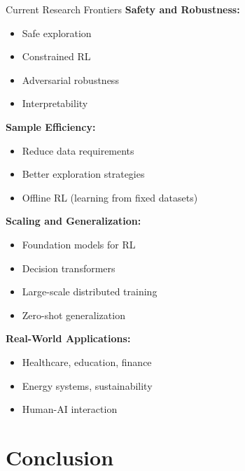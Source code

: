 \documentclass[aspectratio=169]{beamer}
\begin{document}
\begin{frame}{Current Research Frontiers}
  \textbf{Safety and Robustness:}
  \begin{itemize}
    \item Safe exploration
    \item Constrained RL
    \item Adversarial robustness
    \item Interpretability
  \end{itemize}

  \vspace{0.5em}

  \textbf{Sample Efficiency:}
  \begin{itemize}
    \item Reduce data requirements
    \item Better exploration strategies
    \item Offline RL (learning from fixed datasets)
  \end{itemize}

  \vspace{0.5em}

  \textbf{Scaling and Generalization:}
  \begin{itemize}
    \item Foundation models for RL
    \item Decision transformers
    \item Large-scale distributed training
    \item Zero-shot generalization
  \end{itemize}

  \vspace{0.5em}

  \textbf{Real-World Applications:}
  \begin{itemize}
    \item Healthcare, education, finance
    \item Energy systems, sustainability
    \item Human-AI interaction
  \end{itemize}
\end{frame}

\section{Conclusion}
\end{document}
